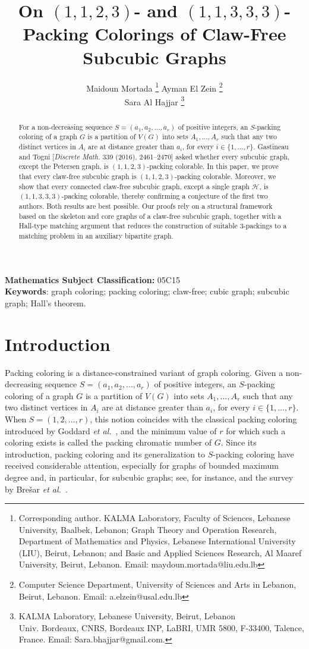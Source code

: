 \documentclass[12pt, oneside]{scrartcl}
\author{ Maidoun Mortada \footnote{Corresponding author. KALMA Laboratory, Faculty of Sciences, Lebanese University, Baalbek, Lebanon; Graph Theory and Operation Research, Department of Mathematics and Physics, Lebanese International University (LIU), Beirut, Lebanon; and Basic and
Applied Sciences Research, Al Maaref University, Beirut, Lebanon. Email: maydoun.mortada@liu.edu.lb} \hspace{0.4cm} Ayman El Zein \footnote{Computer Science Department, University of Sciences and Arts in Lebanon, Beirut, Lebanon. Email: a.elzein@usal.edu.lb} \\
Sara Al Hajjar \footnote{
KALMA Laboratory, Lebanese University, Beirut, Lebanon \\
Univ. Bordeaux, CNRS, Bordeaux INP, LaBRI, UMR 5800, F-33400, Talence,
France. Email: Sara.bhajjar@gmail.com.}
}
\date{}
\begin{document}
 
\title{On $(1,1,2,3)$- and $(1,1,3,3,3)$-Packing Colorings of Claw-Free Subcubic Graphs}
\maketitle


\begin{abstract}
For a non-decreasing sequence $S=(a_1,a_2,\ldots,a_r)$ of positive integers, an $S$-packing coloring of a graph $G$ is a partition of $V(G)$ into sets $A_1,\ldots,A_r$ such that any two distinct vertices in $A_i$ are at distance greater than $a_i$, for every $i\in\{1,\ldots,r\}$. Gastineau and Togni [\emph{Discrete Math.} 339 (2016), 2461--2470] asked whether every subcubic graph, except the Petersen graph, is $(1,1,2,3)$-packing colorable. In this paper, we prove that every claw-free subcubic graph is $(1,1,2,3)$-packing colorable. Moreover, we show that every connected claw-free subcubic graph, except a single graph $\mathcal{H}$, is $(1,1,3,3,3)$-packing colorable, thereby confirming a conjecture of the first two authors. Both results are best possible. Our proofs rely on a structural framework based on the skeleton and core graphs of a claw-free subcubic graph, together with a Hall-type matching argument that reduces the construction of suitable $3$-packings to a matching problem in an auxiliary bipartite graph.

\end{abstract}

\noindent\textbf{Mathematics Subject Classification:} 05C15\\
\textbf{Keywords}: graph coloring; packing coloring; claw-free; cubic graph; subcubic graph; Hall's theorem.

\section{Introduction}

Packing coloring is a distance-constrained variant of graph coloring. Given a non-decreasing sequence $S=(a_1,a_2,\ldots,a_r)$ of positive integers, an $S$-packing coloring of a graph $G$ is a partition of $V(G)$ into sets $A_1,\ldots,A_r$ such that any two distinct vertices in $A_i$ are at distance greater than $a_i$, for every $i \in \{1,\ldots,r\}$. When $S=(1,2,\ldots,r)$, this notion coincides with the classical packing coloring introduced by Goddard \emph{et al.}~\cite{d}, and the minimum value of $r$ for which such a coloring exists is called the packing chromatic number of $G$. Since its introduction, packing coloring and its generalization to $S$-packing coloring have received considerable attention, especially for graphs of bounded maximum degree and, in particular, for subcubic graphs; see, for instance, \cite{bkl,3,bf,11,8,9,AM1,AM2,16,outer,24,m,LW,LZZ24,AM3,26,27,mai,mai1,i,a,ZZ2026} and the survey by Bre\v{s}ar \emph{et al.}~\cite{bfk}.
\end{document}
